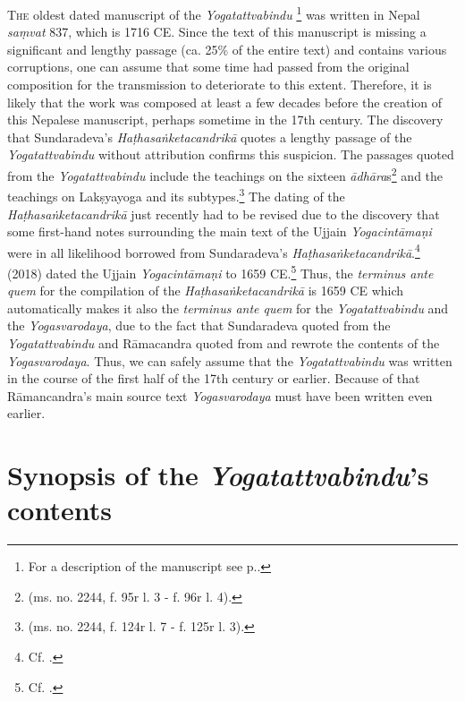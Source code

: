 \lettrine[lines=2, lhang=0.2, loversize=0.25]{T}{he} oldest dated manuscript of the \textit{Yogatattvabindu} \footnote{For a description of the manuscript see  p.\pageref{n1description}.} was written in Nepal \textit{saṃvat} 837, which is 1716 CE. Since the text of this manuscript is missing a significant and lengthy passage (ca. 25\% of the entire text) and contains various corruptions, one can assume that some time had passed from the original composition for the transmission to deteriorate to this extent. Therefore, it is likely that the work was composed at least a few decades before the creation of this Nepalese manuscript, perhaps sometime in the 17th century. The discovery that Sundaradeva's \textit{Haṭhasaṅketacandrikā} quotes a lengthy passage of the \textit{Yogatattvabindu} without attribution confirms this suspicion. The passages quoted from the \textit{Yogatattvabindu} include the teachings on the sixteen \textit{ādhāra}s\footnote{ (ms. no. 2244, f. 95r l. 3 - f. 96r l. 4).} and the teachings on Lakṣyayoga and its subtypes.\footnote{ (ms. no. 2244, f. 124r l. 7 - f. 125r l. 3).} The dating of the \textit{Haṭhasaṅketacandrikā} just recently had to be revised due to the discovery that some first-hand notes surrounding the main text of the Ujjain \textit{Yogacintāmaṇi} were in all likelihood borrowed from Sundaradeva's \textit{Haṭhasaṅketacandrikā}.\footnote{Cf. \citeauthor[2024: 52-54]{birch2024}.} \citeauthor{birch2018proliferation} (2018) dated the Ujjain \textit{Yogacintāmaṇi} to 1659 CE.\footnote{Cf. \citeauthor[2018: 50, n. 111]{birch2018proliferation}.} Thus, the \textit{terminus ante quem} for the compilation of the \textit{Haṭhasaṅketacandrikā} is 1659 CE which automatically makes it also the \textit{terminus ante quem} for the \textit{Yogatattvabindu} and the \textit{Yogasvarodaya}, due to the fact that Sundaradeva quoted from the \textit{Yogatattvabindu} and Rāmacandra quoted from and rewrote the contents of the \textit{Yogasvarodaya}. Thus, we can safely assume that the \textit{Yogatattvabindu} was written in the course of the first half of the 17th century or earlier. Because of that Rāmancandra's main source text \textit{Yogasvarodaya} must have been written even earlier.

\section{Synopsis of the \emph{Yogatattvabindu}'s contents}

